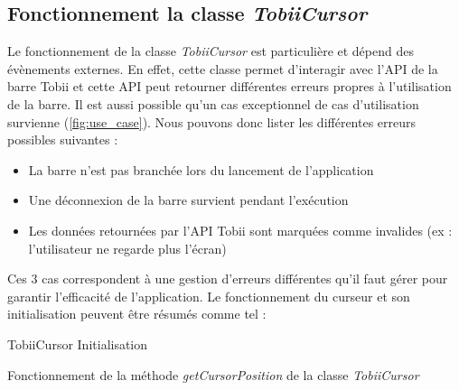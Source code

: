 \documentclass{polytech/polytech}
\begin{document}
\subsection{Fonctionnement la classe \textit{TobiiCursor}}
\label{sec:fonc_tobii}
Le fonctionnement de la classe \textit{TobiiCursor} est particulière et dépend des évènements externes. En effet, cette classe permet d'interagir avec l'API de la barre Tobii et cette API peut retourner différentes erreurs propres à l'utilisation de la barre. Il est aussi possible qu'un cas exceptionnel de cas d'utilisation survienne (\autoref{fig:use_case}). Nous pouvons donc lister les différentes erreurs possibles suivantes : 
\begin{itemize}
    \item La barre n'est pas branchée lors du lancement de l'application
    \item Une déconnexion de la barre survient pendant l'exécution
    \item Les données retournées par l'API Tobii sont marquées comme invalides (ex : l'utilisateur ne regarde plus l'écran)
\end{itemize}
Ces 3 cas correspondent à une gestion d'erreurs différentes qu'il faut gérer pour garantir l'efficacité de l'application. Le fonctionnement du curseur et son initialisation peuvent être résumés comme tel :

\begin{algorithm}
\SetAlgoLined
\DontPrintSemicolon
{}
\caption{TobiiCursor Initialisation}
\label{algo:init_tobiiCursor}
\end{algorithm}

\begin{algorithm}
\SetAlgoLined
\DontPrintSemicolon
{}
\caption{Fonctionnement de la méthode \textit{getCursorPosition} de la classe \textit{TobiiCursor}}
\label{algo:getpos_tobiiCursor}
\end{algorithm}
\end{document}
